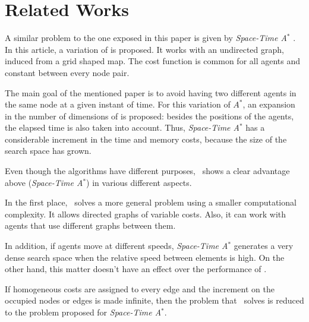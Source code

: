 \section{Related Works}

A similar problem to the one exposed in this paper is
given by \textit{Space-Time A$^*$} \cite{art3}. In this article, 
a variation of \astar is proposed. It works with an undirected
graph, induced from a grid shaped map. The cost function is common
for all agents and constant between every node pair. 

The main goal of the mentioned paper is to avoid having two 
different agents in the same node at a given instant of time.
For this variation of $A^*$, an expansion in the number of dimensions
of \astar	 is proposed: besides the positions of the agents, the elapsed
time is also taken into account. Thus, \textit{Space-Time A$^*$} has a 
considerable increment in the time and memory costs, because the size
of the search space has grown. 

Even though the algorithms have different purposes, \ambush\
shows a clear advantage above (\textit{Space-Time
 A$^*$}) in various different aspects.

In the first place, \ambush\ solves a more general problem 
using a smaller computational complexity. It allows directed 
graphs of variable costs. Also, it can work with agents that
 use different graphs between them.

In addition, if agents move at different speeds,
\textit{Space-Time A$^*$} generates a very dense search
space when the relative speed between elements is high. On the
other hand, this matter doesn't have an effect over the 
performance of \ambush.

If homogeneous costs are assigned to every edge and the increment
on the occupied nodes or edges is made infinite, then the problem that
\ambush\ solves is reduced to the problem proposed for \textit{Space-Time
A$^*$}.
